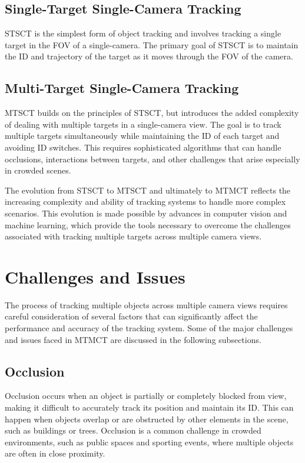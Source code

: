 \subsection{Single-Target Single-Camera Tracking}\label{subsec:st_sct}
STSCT is the simplest form of object tracking and involves tracking a single target in the FOV of a single-camera. The primary goal of STSCT is to maintain the ID and trajectory of the target as it moves through the FOV of the camera.

\subsection{Multi-Target Single-Camera Tracking}\label{subsec:mt_sct}
MTSCT builds on the principles of STSCT, but introduces the added complexity of dealing with multiple targets in a single-camera view. The goal is to track multiple targets simultaneously while maintaining the ID of each target and avoiding ID switches. This requires sophisticated algorithms that can handle occlusions, interactions between targets, and other challenges that arise especially in crowded scenes.

The evolution from STSCT to MTSCT and ultimately to MTMCT reflects the increasing complexity and ability of tracking systems to handle more complex scenarios. This evolution is made possible by advances in computer vision and machine learning, which provide the tools necessary to overcome the challenges associated with tracking multiple targets across multiple camera views.

\section{Challenges and Issues}\label{sec:challenges_and_issues}
The process of tracking multiple objects across multiple camera views requires careful consideration of several factors that can significantly affect the performance and accuracy of the tracking system. Some of the major challenges and issues faced in MTMCT are discussed in the following subsections.

\subsection{Occlusion}\label{subsec:occlusion}
Occlusion occurs when an object is partially or completely blocked from view, making it difficult to accurately track its position and maintain its ID. This can happen when objects overlap or are obstructed by other elements in the scene, such as buildings or trees. Occlusion is a common challenge in crowded environments, such as public spaces and sporting events, where multiple objects are often in close proximity.

